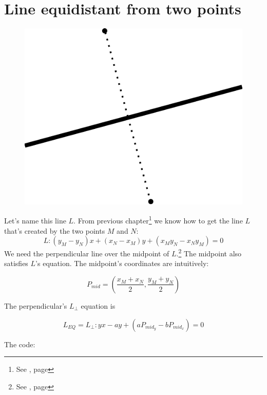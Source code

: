 \documentclass[12pt,openany,a4,usenames,dvipsnames]{book}
\begin{document}
\chapter{Line equidistant from two points}
\begin{figure}[H]
\centering
\includegraphics[height=8\baselineskip,keepaspectratio]{figures/equidistant.pdf}
\end{figure}
Let's name this line $L$. From previous chapter\footnote{See \emph{}, page \pageref{sec:linethroughtwopoints}} we know how to get the line $L$ that's created by the two points $M$ and $N$:
%
$$L: (y_M - y_N)x + (x_N-x_M)y+(x_{M}y_{N}-x_{N}y_{M})=0$$%
%
We need the perpendicular line over the midpoint of $L$.\footnote{See \emph{}, page \pageref{sec:perpendicular}} The midpoint also satisfies $L$'s equation. The midpoint's coordinates are intuitively:

$$P_{mid} = \left(\frac{x_M + x_N}{2}, \frac{y_M + y_N}{2}\right)$$

The perpendicular's $L_{⊥}$ equation is

$$L_{EQ} = L_{⊥}: yx-ay+\left(aP_{mid_y}-bP_{mid_x}\right)=0$$

\noindent{}The code:
\end{document}
